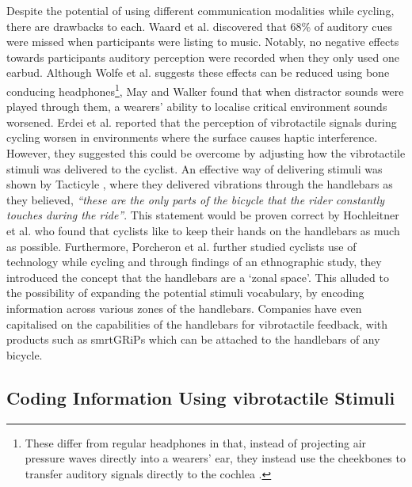 \documentclass{mpaper}
\begin{document}
Despite the potential of using different communication modalities while cycling, there are drawbacks to each. Waard et al. \cite{DEWAARD2011626} discovered that 68\% of auditory cues were missed when participants were listing to music. Notably, no negative effects towards participants auditory perception were recorded when they only used one earbud. Although Wolfe et al. \cite{wolfe2016distracted} suggests these effects can be reduced using bone conducing headphones\footnote{These differ from regular headphones in that, instead of projecting air pressure waves directly into a wearers' ear, they instead use the cheekbones to transfer auditory signals directly to the cochlea \cite{littler1952hearing}.}, May and Walker \cite{may2017effects} found that when distractor sounds were played through them, a wearers' ability to localise critical environment sounds worsened. Erdei et al. \cite{erdei2020comparing, doi:10.1080/15389588.2021.1985113} reported that the perception of vibrotactile signals during cycling worsen in environments where the surface causes haptic interference. However, they suggested this could be overcome by adjusting how the vibrotactile stimuli was delivered to the cyclist. An effective way of delivering stimuli was shown by Tacticyle \cite{10.1145/2371574.2371631}, where they delivered vibrations through the handlebars as they believed, \textit{“these are the only parts of the bicycle that the rider constantly touches during the ride”}. This statement would be proven correct by Hochleitner et al. \cite{10.1145/3152832.3152871} who found that cyclists like to keep their hands on the handlebars as much as possible. Furthermore, Porcheron et al. \cite{10.1145/3544548.3580971} further studied cyclists use of technology while cycling and through findings of an ethnographic study, they introduced the concept that the handlebars are a ‘zonal space’. This alluded to the possibility of expanding the potential stimuli vocabulary, by encoding information across various zones of the handlebars. Companies have even capitalised on the capabilities of the handlebars for vibrotactile feedback, with products such as smrtGRiPs \cite{smartgrips} which can be attached to the handlebars of any bicycle.


\subsection{Coding Information Using vibrotactile Stimuli}
\end{document}
